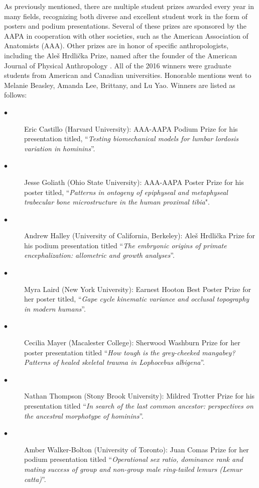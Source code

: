 \documentclass[english]{ijsra}
\begin{document}
As previously mentioned, there are multiple student prizes awarded every year in many fields,
recognizing both diverse and excellent student work in the form of posters and podium presentations. 
Several of these prizes are sponsored by the AAPA in cooperation with other societies,
such as the American Association of Anatomists (AAA). 
Other prizes are in honor of specific anthropologists, including the Aleš Hrdlička Prize,
named after the founder of the American Journal of Physical Anthropology \parencite{american association of physical anthropologists}.
All of the 2016 winners were graduate students from American and Canadian universities. 
Honorable mentions went to Melanie Beasley, Amanda Lee, Brittany, and Lu Yao.  
Winners are listed as follows: 
\begin{description}
  \item[$\bullet$] Eric Castillo (Harvard University): AAA-AAPA Podium Prize for his presentation titled, “\emph{Testing biomechanical models for lumbar lordosis variation in hominins}”.
  \item[$\bullet$] Jesse Goliath (Ohio State University): AAA-AAPA Poster Prize for his poster titled, “\emph{Patterns in ontogeny of epiphyseal and metaphyseal trabecular bone microstructure in the human proximal tibia}".
  \item[$\bullet$] Andrew Halley (University of California, Berkeley): Aleš Hrdlička Prize for his podium presentation titled “\emph{The embryonic origins of primate encephalization: allometric and growth analyses}”.
  \item[$\bullet$] Myra Laird (New York University): Earnest Hooton Best Poster Prize for her poster titled, “\emph{Gape cycle kinematic variance and occlusal topography in modern humans}”.
  \item[$\bullet$] Cecilia Mayer (Macalester College): Sherwood Washburn Prize for her poster presentation titled “\emph{How tough is the grey-cheeked mangabey? Patterns of healed skeletal trauma in \emph{Lophocebus albigena}}”.
  \item[$\bullet$] Nathan Thompson (Stony Brook University): Mildred Trotter Prize for his presentation titled “\emph{In search of the last common ancestor: perspectives on the ancestral morphotype of hominins}”.
  \item[$\bullet$] Amber Walker-Bolton (University of Toronto): Juan Comas Prize for her podium presentation titled “\emph{Operational sex ratio, dominance rank and mating success of group and non-group male ring-tailed lemurs (\emph{Lemur catta})}”.
\end{description}
\end{document}
